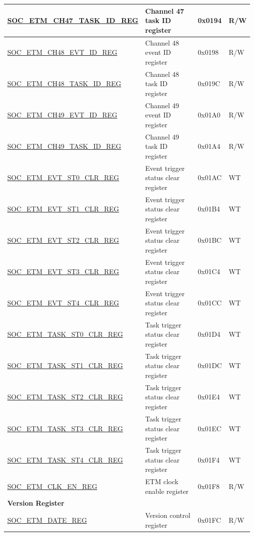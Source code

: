 \begin{longtable}{ | p{6cm} | p{6.2cm} | p{1.3cm} | p{2cm} | }
\hyperref[regdesc:SOCETMCHNTASKIDREG]{SOC\_ETM\_CH47\_TASK\_ID\_REG} & Channel 47 task ID register & 0x0194 & R/W \\ \hline
\hyperref[regdesc:SOCETMCHNEVTIDREG]{SOC\_ETM\_CH48\_EVT\_ID\_REG} & Channel 48 event ID register & 0x0198 & R/W \\ \hline
\hyperref[regdesc:SOCETMCHNTASKIDREG]{SOC\_ETM\_CH48\_TASK\_ID\_REG} & Channel 48 task ID register & 0x019C & R/W \\ \hline
\hyperref[regdesc:SOCETMCHNEVTIDREG]{SOC\_ETM\_CH49\_EVT\_ID\_REG} & Channel 49 event ID register & 0x01A0 & R/W \\ \hline
\hyperref[regdesc:SOCETMCHNTASKIDREG]{SOC\_ETM\_CH49\_TASK\_ID\_REG} & Channel 49 task ID register & 0x01A4 & R/W \\ \hline
\hyperref[regdesc:SOCETMEVTST0CLRREG]{SOC\_ETM\_EVT\_ST0\_CLR\_REG} & Event trigger status clear register & 0x01AC & WT \\ \hline
\hyperref[regdesc:SOCETMEVTST1CLRREG]{SOC\_ETM\_EVT\_ST1\_CLR\_REG} & Event trigger status clear register & 0x01B4 & WT \\ \hline
\hyperref[regdesc:SOCETMEVTST2CLRREG]{SOC\_ETM\_EVT\_ST2\_CLR\_REG} & Event trigger status clear register & 0x01BC & WT \\ \hline
\hyperref[regdesc:SOCETMEVTST3CLRREG]{SOC\_ETM\_EVT\_ST3\_CLR\_REG} & Event trigger status clear register & 0x01C4 & WT \\ \hline
\hyperref[regdesc:SOCETMEVTST4CLRREG]{SOC\_ETM\_EVT\_ST4\_CLR\_REG} & Event trigger status clear register & 0x01CC & WT \\ \hline
\hyperref[regdesc:SOCETMTASKST0CLRREG]{SOC\_ETM\_TASK\_ST0\_CLR\_REG} & Task trigger status clear register & 0x01D4 & WT \\ \hline
\hyperref[regdesc:SOCETMTASKST1CLRREG]{SOC\_ETM\_TASK\_ST1\_CLR\_REG} & Task trigger status clear register & 0x01DC & WT \\ \hline
\hyperref[regdesc:SOCETMTASKST2CLRREG]{SOC\_ETM\_TASK\_ST2\_CLR\_REG} & Task trigger status clear register & 0x01E4 & WT \\ \hline
\hyperref[regdesc:SOCETMTASKST3CLRREG]{SOC\_ETM\_TASK\_ST3\_CLR\_REG} & Task trigger status clear register & 0x01EC & WT \\ \hline
\hyperref[regdesc:SOCETMTASKST4CLRREG]{SOC\_ETM\_TASK\_ST4\_CLR\_REG} & Task trigger status clear register & 0x01F4 & WT \\ \hline
\hyperref[regdesc:SOCETMCLKENREG]{SOC\_ETM\_CLK\_EN\_REG} & ETM clock enable register & 0x01F8 & R/W \\ \hline
\multicolumn{4}{|l|}{\textbf{Version Register}} \\ \hline
\hyperref[regdesc:SOCETMDATEREG]{SOC\_ETM\_DATE\_REG} & Version control register & 0x01FC & R/W \\ \hline
\end{longtable}
